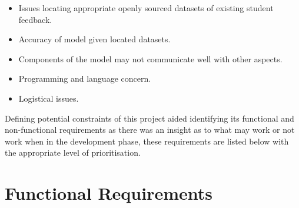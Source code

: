 \begin{itemize}
    \item Issues locating appropriate openly sourced datasets of existing student feedback.
    \item Accuracy of model given located datasets.
    \item Components of the model may not communicate well with other aspects.
    \item Programming and language concern.
    \item Logistical issues.
\end{itemize}

Defining potential constraints of this project aided identifying its functional and non-functional requirements as there was an insight as to what may work or not work when in the development phase, these requirements are listed below with the appropriate level of prioritisation.

\section{Functional Requirements} \label{section:FunctionalRequirements}

